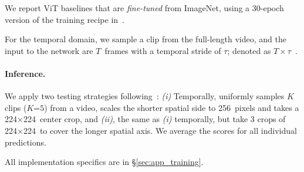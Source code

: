 \documentclass[10pt,twocolumn,letterpaper]{article}
\def\x{$\times$}
\begin{document}
We report  ViT baselines that are \textit{fine-tuned} from ImageNet, using a 30-epoch version of the training recipe in~\cite{Feichtenhofer2019}.

For the temporal domain, we sample a clip from the full-length video, and the input to the network are  $T$~frames with a temporal stride of $\tau$; denoted as $T\times\tau$~\cite{Feichtenhofer2019}.
\paragraph{Inference.}  We apply two testing strategies following~\cite{Feichtenhofer2019,feichtenhofer2020x3d}: \textit{(i)} Temporally, uniformly samples $K$ clips  (\eg $K$=$5$)  from a video, scales the shorter spatial side to 256~pixels and takes a 224\x224~center crop, and
\textit{(ii)}, the same as \textit{(i)} temporally, but take 3 crops of 224\x224~to cover the longer spatial axis.
We average the 
scores for all individual predictions.

All implementation specifics are in \S\ref{sec:app_training}.
\end{document}
